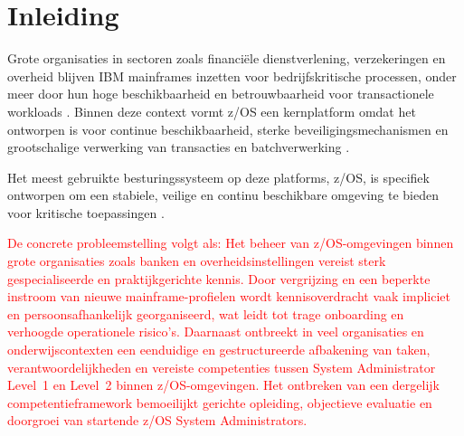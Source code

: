 


% 

\section{Inleiding}%
\label{sec:inleiding}

Grote organisaties in sectoren zoals financi\"ele dienstverlening, verzekeringen en overheid blijven IBM mainframes inzetten voor bedrijfskritische processen, onder meer door hun hoge beschikbaarheid en betrouwbaarheid voor transactionele workloads \autocite{IBMZArchitecture}. 
Binnen deze context vormt z/OS een kernplatform omdat het ontworpen is voor continue beschikbaarheid, sterke beveiligingsmechanismen en grootschalige verwerking van transacties en batchverwerking \autocite{IBMzOSOverview,IBMRedbookzOS}. 

Het meest gebruikte besturingssysteem op deze platforms, z/OS, is specifiek ontworpen om een stabiele, veilige en continu beschikbare omgeving te bieden voor kritische toepassingen \autocite{IBMzOSOverview}.

\textcolor{red}{De concrete probleemstelling volgt als:}
\textcolor{red}{
	Het beheer van z/OS-omgevingen binnen grote organisaties zoals banken en overheidsinstellingen vereist sterk gespecialiseerde en praktijkgerichte kennis. 
	Door vergrijzing en een beperkte instroom van nieuwe mainframe-profielen wordt kennisoverdracht vaak impliciet en persoonsafhankelijk georganiseerd, wat leidt tot trage onboarding en verhoogde operationele risico’s. 
	Daarnaast ontbreekt in veel organisaties en onderwijscontexten een eenduidige en gestructureerde afbakening van taken, verantwoordelijkheden en vereiste competenties tussen System Administrator Level~1 en Level~2 binnen z/OS-omgevingen. 
	Het ontbreken van een dergelijk competentieframework bemoeilijkt gerichte opleiding, objectieve evaluatie en doorgroei van startende z/OS System Administrators.}

